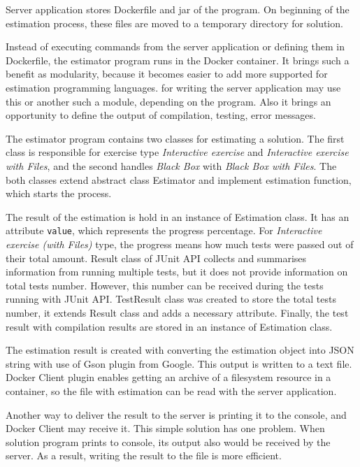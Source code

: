         Server application stores Dockerfile and jar of the program. On beginning of the estimation process, these files are moved to a temporary directory for solution. 
        
        Instead of executing commands from the server application or defining them in Dockerfile, the estimator program runs in the Docker container. It brings such a benefit as modularity, because it becomes easier to add more supported for estimation programming languages. 
        for writing the server application may use this or another such a module, depending on the program. Also it brings an opportunity to define the output of compilation, testing, error messages.
        
        The estimator program contains two classes for estimating a solution. The first class is responsible for exercise type \textit{Interactive exercise} and \textit{Interactive exercise with Files}, and the second handles \textit{Black Box} with \textit{Black Box with Files}. The both classes extend abstract class Estimator and implement estimation function, which starts the process.
        
        The result of the estimation is hold in an instance of Estimation class. It has an attribute \texttt{value}, which represents the progress percentage. For \textit{Interactive exercise (with Files)} type, the progress means how much tests were passed out of their total amount. Result class of JUnit API collects and summarises information from running multiple tests, but it does not provide information on total tests number. However, this number can be received during the tests running with JUnit API. TestResult class was created to store the total tests number, it extends Result class and adds a necessary attribute. Finally, the test result with compilation results are stored in an instance of Estimation class.
        
        The estimation result is created with converting the estimation object into JSON string with use of Gson plugin from Google. This output is written to a text file. Docker Client plugin enables getting an archive of a filesystem resource in a container, so the file with estimation can be read with the server application.
        
        Another way to deliver the result to the server is printing it to the console, and Docker Client may receive it. This simple solution has one problem. When solution program prints to console, its output also would be received by the server. As a result, writing the result to the file is more efficient.
    
